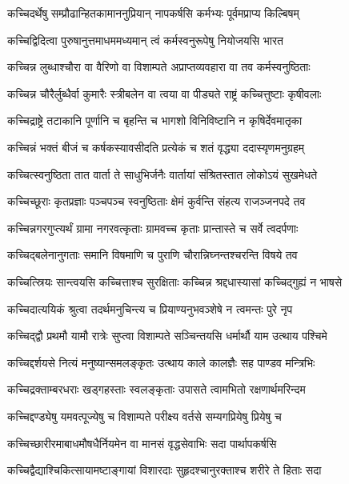 \twolineshloka
{कच्चिदर्थेषु सम्प्रौढान्हितकामाननुप्रियान्}
{नापकर्षसि कर्मभ्यः पूर्वमप्राप्य किल्बिषम्}


\twolineshloka
{कच्चिद्विदित्वा पुरुषानुत्तमाधममध्यमान्}
{त्वं कर्मस्वनुरूपेषु नियोजयसि भारत}


\twolineshloka
{कच्चिन्न लुब्धाश्चौरा वा वैरिणो वा विशाम्पते}
{अप्राप्तव्यवहारा वा तव कर्मस्वनुष्ठिताः}


\twolineshloka
{कच्चिन्न चौरैर्लुब्धैर्वा कुमारैः स्त्रीबलेन वा}
{त्वया वा पीड्यते राष्ट्रं कच्चित्तुष्टाः कृषीवलाः}


\twolineshloka
{कच्चिद्राष्ट्रे तटाकानि पूर्णानि च बृहन्ति च}
{भागशो विनिविष्टानि न कृषिर्देवमातृका}


\twolineshloka
{कच्चिन्नं भक्तं बीजं च कर्षकस्यावसीदति}
{प्रत्येकं च शतं वृद्ध्या ददास्यृणमनुग्रहम्}


\twolineshloka
{कच्चित्स्वनुष्ठिता तात वार्ता ते साधुभिर्जनैः}
{वार्तायां संश्रितस्तात लोकोऽयं सुखमेधते}


\twolineshloka
{कच्चिच्छूराः कृतप्रज्ञाः पञ्चपञ्च स्वनुष्ठिताः}
{क्षेमं कुर्वन्ति संहत्य राजञ्जनपदे तव}


\twolineshloka
{कच्चिन्नगरगुप्त्यर्थं ग्रामा नगरवत्कृताः}
{ग्रामवच्च कृताः प्रान्तास्ते च सर्वे त्वदर्पणाः}


\twolineshloka
{कच्चिद्बलेनानुगताः समानि विषमाणि च}
{पुराणि चौरान्निघ्नन्तश्चरन्ति विषये तव}


\twolineshloka
{कच्चित्स्रियः सान्त्वयसि कच्चित्ताश्च सुरक्षिताः}
{कच्चिन्न श्रद्दधास्यासां कच्चिद्गुह्यं न भाषसे}


\twolineshloka
{कच्चिदात्ययिकं श्रुत्वा तदर्थमनुचिन्त्य च}
{प्रियाण्यनुभवञ्शेषे न त्वमन्तः पुरे नृप}


\twolineshloka
{कच्चिद्द्वौ प्रथमौ यामौ रात्रेः सुप्त्वा विशाम्पते}
{सञ्चिन्तयसि धर्मार्थौ याम उत्थाय पश्चिमे}


\twolineshloka
{कच्चिद्दर्शयसे नित्यं मनुष्यान्समलङ्कृतः}
{उत्थाय काले कालज्ञैः सह पाण्डव मन्त्रिभिः}


\twolineshloka
{कच्चिद्रक्ताम्बरधराः खड्गहस्ताः स्वलङ्कृताः}
{उपासते त्वामभितो रक्षणार्थमरिन्दम}


\twolineshloka
{कच्चिद्दण्ड्येषु यमवत्पूज्येषु च विशाम्पते}
{परीक्ष्य वर्तसे सम्यगप्रियेषु प्रियेषु च}


\twolineshloka
{कच्चिच्छारीरमाबाधमौषधैर्नियमेन वा}
{मानसं वृद्धसेवाभिः सदा पार्थापकर्षसि}


\twolineshloka
{कच्चिद्वैद्याश्चिकित्सायामष्टाङ्गायां विशारदाः}
{सुहृदश्चानुरक्ताश्च शरीरे ते हिताः सदा}


